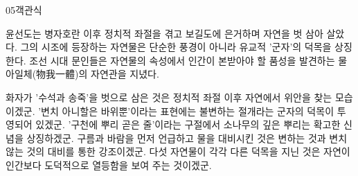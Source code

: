 \documentclass[fs85,seriesWit]{korfarm-base}
\begin{document}
\begin{kfQBlock}{05}{객관식}
\begin{kfEvidence}윤선도는 병자호란 이후 정치적 좌절을 겪고 보길도에 은거하며 자연을 벗 삼아 살았다. 그의 시조에 등장하는 자연물은 단순한 풍경이 아니라 유교적 '군자'의 덕목을 상징한다. 조선 시대 문인들은 자연물의 속성에서 인간이 본받아야 할 품성을 발견하는 물아일체(物我一體)의 자연관을 지녔다.\end{kfEvidence}
\begin{kfChoices}
\kfChoice 화자가 '수석과 송죽'을 벗으로 삼은 것은 정치적 좌절 이후 자연에서 위안을 찾는 모습이겠군.
\kfChoice '변치 아니할은 바위뿐'이라는 표현에는 불변하는 절개라는 군자의 덕목이 투영되어 있겠군.
\kfChoice '구천에 뿌리 곧은 줄'이라는 구절에서 소나무의 깊은 뿌리는 확고한 신념을 상징하겠군.
\kfChoice 구름과 바람을 먼저 언급하고 물을 대비시킨 것은 변하는 것과 변치 않는 것의 대비를 통한 강조이겠군.
\kfChoice 다섯 자연물이 각각 다른 덕목을 지닌 것은 자연이 인간보다 도덕적으로 열등함을 보여 주는 것이겠군.
\end{kfChoices}
\end{kfQBlock}

\kfEndMC
\end{document}
